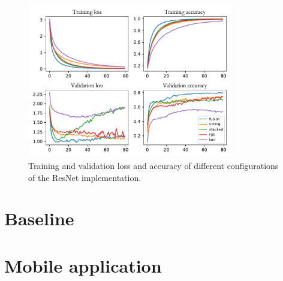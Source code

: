 \documentclass{l4proj}
\begin{document}
\begin{appendices}
\begin{figure}[ht]
  \centering
  \includegraphics[width=0.8\textwidth]{images/evaluation/gridsearch/ResNet}
  \caption{Training and validation loss and accuracy of different configurations of the ResNet implementation.}
  \label{fig:resnet_configs_app}
\end{figure}

\chapter{Baseline}
\label{appendix_baseline}


\chapter{Mobile application}


\end{appendices}
\end{document}
